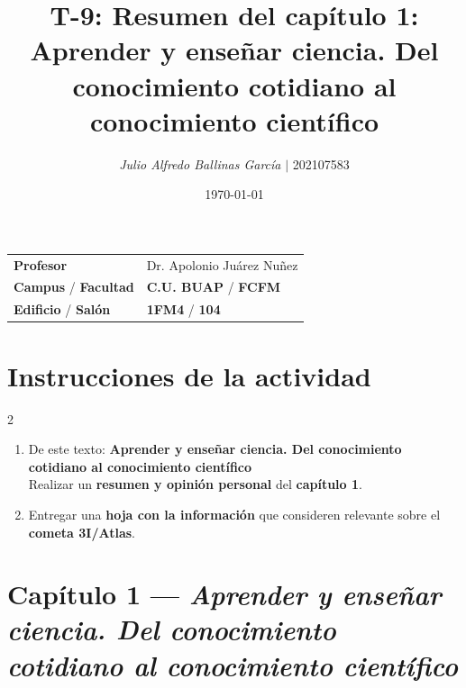 \documentclass{article}
\title{ \textcolor{Tarawera}{\textbf{T-\textcolor{Sun}{\textbf{9}}}}: \textcolor{Cinnabar}{\textbf{Resumen del capítulo 1: \textcolor{orange(colorwheel)}{\textbf{Aprender y enseñar ciencia. Del conocimiento cotidiano al conocimiento científico}}}}}
\author{\emph{Julio Alfredo Ballinas García} $\boldsymbol{\mid}$ 202107583}
\date{\today}
\begin{document}
\maketitle



\begin{mybox}
	\noindent\begin{tabular}{@{}ll}
		{\bfseries{Profesor}} & Dr. Apolonio Juárez Nuñez\\
		\textcolor{prussianblue}{\bfseries{Campus}} / \textcolor{trueblue}{\bfseries{Facultad}}  & \textcolor{prussianblue}{\bfseries{C.U. BUAP}} /  \textcolor{trueblue}{\bfseries{FCFM}} \\
		\textcolor{prussianblue}{\bfseries{Edificio}} /  \textcolor{trueblue}{\bfseries{Salón}}    & 	\textcolor{prussianblue}{\bfseries{1FM4}} /  \textcolor{trueblue}{\bfseries{104}}   
	\end{tabular} 
\end{mybox} \vspace{1cm}

\section*{Instrucciones de la actividad}

\setlength{\columnsep}{2cm}
\begin{multicols}{2} %
	\begin{enumerate}[label={{\textcolor{trueblue}{\textbf{Ej}. \arabic*.0}}}, start=1]
		\item De este texto: \textbf{Aprender y enseñar ciencia. Del conocimiento cotidiano al conocimiento científico} \\
		Realizar un \textbf{resumen y opinión personal} del \textbf{capítulo 1}.
		
		\item Entregar una \textbf{hoja con la información} que consideren relevante sobre el \textbf{cometa 3I/Atlas}.
		
	\end{enumerate}
\end{multicols}

\vspace{2cm}



\tableofcontents  \vspace{2cm}


 \section*{Capítulo 1 — \textit{Aprender y enseñar ciencia. Del conocimiento cotidiano al conocimiento científico}}
\end{document}
